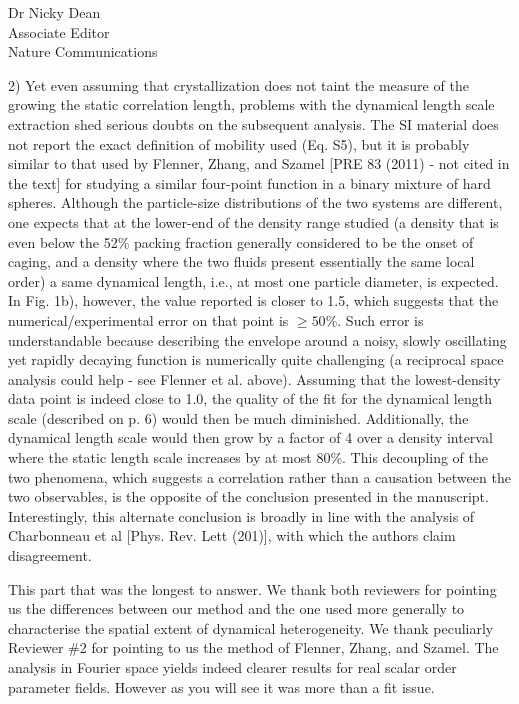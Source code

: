 \documentclass[a4paper, rebuttal, parskip=true, firsthead=false, fromemail=true, foldmarks=false]{scrlttr2}
\begin{document}
\begin{letter}{Dr Nicky Dean\\
Associate Editor\\
Nature Communications}
\begin{quotationi}
2) Yet even assuming that crystallization does not taint the measure of the growing the static correlation length, problems with the dynamical length scale extraction shed serious doubts on the subsequent analysis. The SI material does not report the exact definition of mobility used (Eq. S5), but it is probably similar to that used by Flenner, Zhang, and Szamel [PRE 83 (2011) - not cited in the text] for studying a similar four-point function in a binary mixture of hard spheres. Although the particle-size distributions of the two systems are different, one expects that at the lower-end of the density range studied (a density that is even below the 52\% packing fraction generally considered to be the onset of caging, and a density where the two fluids present essentially the same local order) a same dynamical length, i.e., at most one particle diameter, is expected. In Fig. 1b), however, the value reported is closer to 1.5, which suggests that the numerical/experimental error on that point is $\geq 50\%$. Such error is understandable because describing the envelope around a noisy, slowly oscillating yet rapidly decaying function is numerically quite challenging (a reciprocal space analysis could help - see Flenner et al. above). Assuming that the lowest-density data point is indeed close to 1.0, the quality of the fit for the dynamical length scale (described on p. 6) would then be much diminished. Additionally, the dynamical length scale would then grow by a factor of 4 over a density interval where the static length scale increases by at most 80\%. This decoupling of the two phenomena, which suggests a correlation rather than a causation between the two observables, is the opposite of the conclusion presented in the manuscript. Interestingly, this alternate conclusion is broadly in line with the analysis of Charbonneau et al [Phys. Rev. Lett (201)], with which the authors claim disagreement.
\end{quotationi}

This part that was the longest to answer. We thank both reviewers for pointing us the differences between our method and the one used more generally to characterise the spatial extent of dynamical heterogeneity. We thank peculiarly Reviewer \#2 for pointing to us the method of Flenner, Zhang, and Szamel. The analysis in Fourier space yields indeed clearer results for real scalar order parameter fields. However as you will see it was more than a fit issue.


\end{letter}
\end{document}
